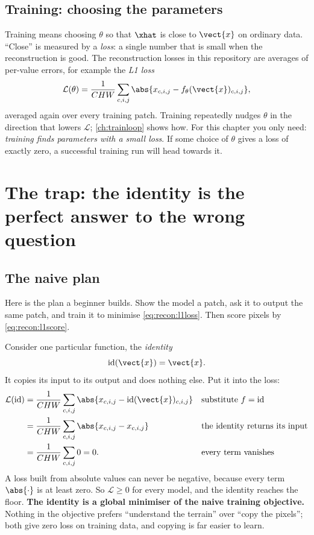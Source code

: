 \subsection{Training: choosing the parameters}

Training means choosing $\theta$ so that $\xhat$ is close to $\vect{x}$ on ordinary
data. ``Close'' is measured by a \emph{loss}: a single number that is small when the
reconstruction is good. The reconstruction losses in this repository are averages of per-value
errors, for example the \emph{L1 loss}
\begin{equation}\label{eq:recon:l1loss}
\mathcal{L}(\theta) = \frac{1}{CHW}\sum_{c,i,j} \abs{x_{c,i,j} - f_{\theta}(\vect{x})_{c,i,j}},
\end{equation}
averaged again over every training patch. Training repeatedly nudges $\theta$ in the direction that
lowers $\mathcal{L}$; \cref{ch:trainloop} shows how. For this chapter you only need: \emph{training
finds parameters with a small loss}. If some choice of $\theta$ gives a loss of exactly zero, a
successful training run will head towards it.

\section{The trap: the identity is the perfect answer to the wrong question}\label{sec:recon:identity}

\subsection{The naive plan}

Here is the plan a beginner builds. Show the model a patch, ask it to output the same patch, and
train it to minimise \cref{eq:recon:l1loss}. Then score pixels by \cref{eq:recon:l1score}.

Consider one particular function, the \emph{identity}
\begin{equation}
\mathrm{id}(\vect{x}) = \vect{x}.
\end{equation}
It copies its input to its output and does nothing else. Put it into the loss:
\begin{align*}
\mathcal{L}(\mathrm{id})
&= \frac{1}{CHW}\sum_{c,i,j} \abs{x_{c,i,j} - \mathrm{id}(\vect{x})_{c,i,j}}
  && \text{substitute $f=\mathrm{id}$}\\
&= \frac{1}{CHW}\sum_{c,i,j} \abs{x_{c,i,j} - x_{c,i,j}}
  && \text{the identity returns its input}\\
&= \frac{1}{CHW}\sum_{c,i,j} 0 = 0.
  && \text{every term vanishes}
\end{align*}
A loss built from absolute values can never be negative, because every term $\abs{\cdot}$ is at least
zero. So $\mathcal{L}\ge 0$ for every model, and the identity reaches the floor. \textbf{The identity is
a global minimiser of the naive training objective.} Nothing in the objective prefers ``understand the
terrain'' over ``copy the pixels''; both give zero loss on training data, and copying is far easier to
learn.

